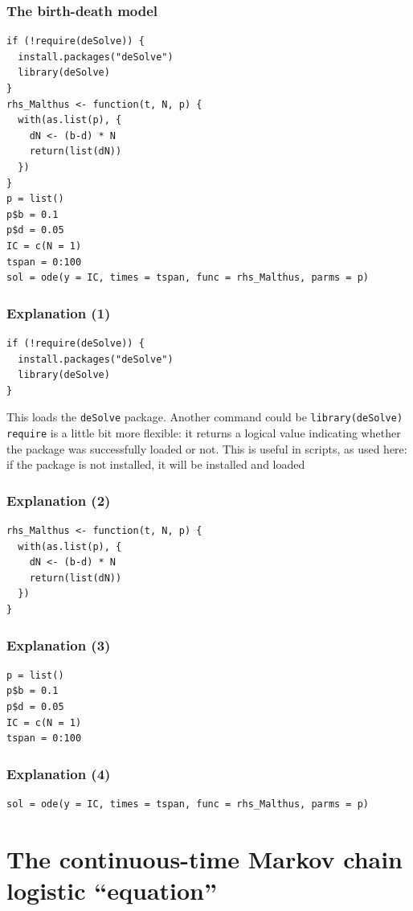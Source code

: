 \documentclass[aspectratio=169]{beamer}
\begin{document}
\begin{frame}[fragile]\frametitle{The birth-death model}
\begin{lstlisting}
if (!require(deSolve)) {
  install.packages("deSolve")
  library(deSolve)
}
rhs_Malthus <- function(t, N, p) {
  with(as.list(p), {
    dN <- (b-d) * N
    return(list(dN))
  })
}
p = list()
p$b = 0.1
p$d = 0.05
IC = c(N = 1)
tspan = 0:100
sol = ode(y = IC, times = tspan, func = rhs_Malthus, parms = p)
\end{lstlisting}
\end{frame}

\begin{frame}[fragile]\frametitle{Explanation (1)}
\begin{lstlisting}
if (!require(deSolve)) {
  install.packages("deSolve")
  library(deSolve)
}
\end{lstlisting}
\vfill 
This loads the \texttt{deSolve} package. Another command could be \texttt{library(deSolve)}
\vfill
\texttt{require} is a little bit more flexible: it returns a logical value indicating whether the package was successfully loaded or not. This is useful in scripts, as used here: if the package is not installed, it will be installed and loaded
\end{frame}

\begin{frame}[fragile]\frametitle{Explanation (2)}
\begin{lstlisting}
rhs_Malthus <- function(t, N, p) {
  with(as.list(p), {
    dN <- (b-d) * N
    return(list(dN))
  })
}
\end{lstlisting}
\end{frame}

\begin{frame}[fragile]\frametitle{Explanation (3)}
\begin{lstlisting}
p = list()
p$b = 0.1
p$d = 0.05
IC = c(N = 1)
tspan = 0:100
\end{lstlisting}
\end{frame}

\begin{frame}[fragile]\frametitle{Explanation (4)}
\begin{lstlisting}
sol = ode(y = IC, times = tspan, func = rhs_Malthus, parms = p)
\end{lstlisting}
\end{frame}

\section{The continuous-time Markov chain logistic ``equation''}
\end{document}
